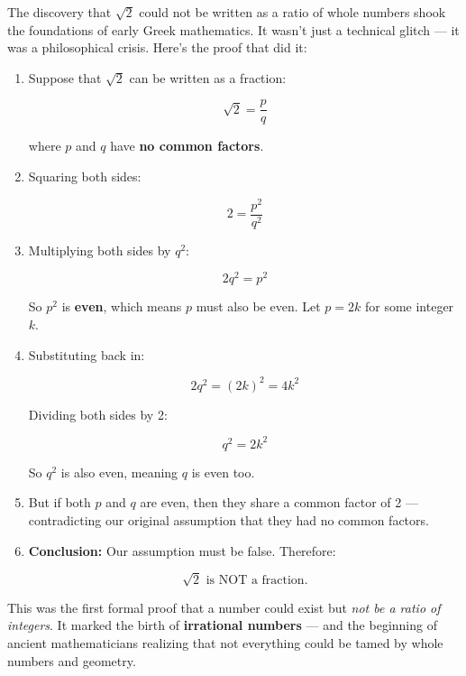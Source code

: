 \begin{tcolorbox}[title=Historical Sidebar: The Proof That Broke Their Brains, colback=gray!5, colframe=black, fonttitle=\bfseries]

  The discovery that \( \sqrt{2} \) could not be written as a ratio of whole numbers shook the foundations of early Greek mathematics. It wasn't just a technical glitch — it was a philosophical crisis. Here's the proof that did it:
  
  \begin{enumerate}
  \item Suppose that \( \sqrt{2} \) can be written as a fraction:
  
     \[
     \sqrt{2} = \frac{p}{q}
     \]
  
     where \( p \) and \( q \) have \textbf{no common factors}.
  
  \item Squaring both sides:
  
     \[
     2 = \frac{p^2}{q^2}
     \]
  
  \item Multiplying both sides by \( q^2 \):
  
     \[
     2q^2 = p^2
     \]
  
     So \( p^2 \) is \textbf{even}, which means \( p \) must also be even. Let \( p = 2k \) for some integer \( k \).
  
  \item Substituting back in:
  
     \[
     2q^2 = (2k)^2 = 4k^2
     \]
  
     Dividing both sides by 2:
  
     \[
     q^2 = 2k^2
     \]
  
     So \( q^2 \) is also even, meaning \( q \) is even too.
  
  \item But if both \( p \) and \( q \) are even, then they share a common factor of 2 --- contradicting our original assumption that they had no common factors.
  
  \item \textbf{Conclusion:} Our assumption must be false. Therefore:
  
     \[
     \sqrt{2} \text{ is NOT a fraction.}
     \]
  
  \end{enumerate}
  
  \medskip
  
  This was the first formal proof that a number could exist but \emph{not be a ratio of integers}. It marked the birth of \textbf{irrational numbers} — and the beginning of ancient mathematicians realizing that not everything could be tamed by whole numbers and geometry.
  
\end{tcolorbox}
